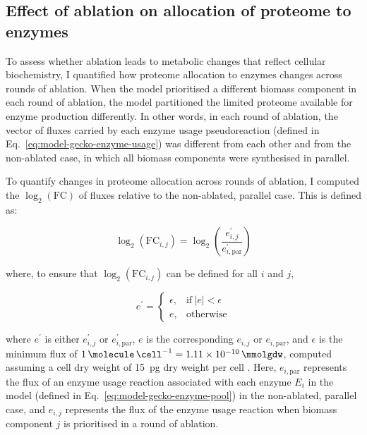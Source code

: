 \subsection{Effect of ablation on allocation of proteome to enzymes}
\label{sec:model-yeast8-pseudometabolites-allocation}

To assess whether ablation leads to metabolic changes that reflect cellular biochemistry, I quantified how proteome allocation to enzymes changes across rounds of ablation.
When the model prioritised a different biomass component in each round of ablation, the model partitioned the limited proteome available for enzyme production differently.
In other words, in each round of ablation, the vector of fluxes carried by each enzyme usage pseudoreaction (defined in Eq.\ \ref{eq:model-gecko-enzyme-usage}) was different from each other and from the non-ablated case, in which all biomass components were synthesised in parallel.

To quantify changes in proteome allocation across rounds of ablation, I computed the $\log_{2}(\mathrm{FC})$ of fluxes relative to the non-ablated, parallel case.
This is defined as:

\begin{equation}
  \log_{2}(\mathrm{FC}_{i,j}) = \log_{2}\left( \frac{e_{i,j}^{\prime}}{e_{i, \mathrm{par}}^{\prime}} \right)
  \label{eq:model-foldchange}
\end{equation}

where, to ensure that $\log_{2}(\mathrm{FC}_{i,j})$ can be defined for all $i$ and $j$,

\begin{equation}
  e^{\prime} =
  \begin{cases}
    \epsilon, & \text{if}\ |e|<\epsilon \\
    e, & \text{otherwise}
  \end{cases}
  \label{eq:model-epsilon-round}
\end{equation}

where $e^{\prime}$ is either $e_{i,j}^{\prime}$ or $e_{i, \mathrm{par}}^{\prime}$, $e$ is the corresponding $e_{i,j}$ or $e_{i, \mathrm{par}}$, and $\epsilon$ is the minimum flux of $\SI{1}{\molecule~\cell^{-1}} = \SI{1.11d-10}{\mmolgdw}$, computed assuming a cell dry weight of \SI{15}{\pico\gram} dry weight per cell \parencite{shermanGettingStartedYeast2002}.
Here, $e_{i, \mathrm{par}}$ represents the flux of an enzyme usage reaction associated with each enzyme $E_{i}$ in the model (defined in Eq.\ \ref{eq:model-gecko-enzyme-pool}) in the non-ablated, parallel case, and $e_{i,j}$ represents the flux of the enzyme usage reaction when biomass component $j$ is prioritised in a round of ablation.

